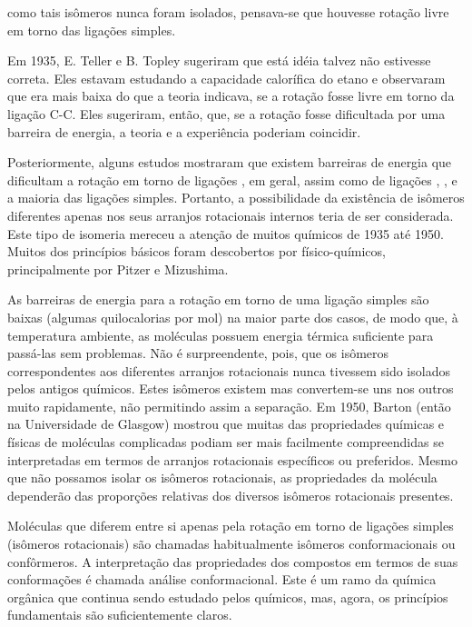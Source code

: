 \noindent como tais isômeros nunca foram isolados, pensava-se que houvesse rotação livre em torno das ligações simples. 

Em 1935, E. Teller e B. Topley sugeriram que está idéia talvez não estivesse correta. Eles estavam estudando a capacidade calorífica do etano e observaram que era mais baixa do que a teoria indicava, se a rotação fosse livre em torno da ligação C-C. Eles sugeriram, então, que, se a rotação fosse dificultada por uma barreira de energia, a teoria e a experiência poderiam coincidir.

Posteriormente, alguns estudos mostraram que existem barreiras de energia que dificultam a rotação em torno de ligações , em geral, assim como de ligações , , e a maioria das ligações simples. Portanto, a possibilidade da existência de isômeros diferentes apenas nos seus arranjos rotacionais internos teria de ser considerada. Este tipo de isomeria mereceu a atenção de muitos químicos de 1935 até 1950. Muitos dos princípios básicos foram descobertos por físico-químicos, principalmente por Pitzer e Mizushima. 

As barreiras de energia para a rotação em torno de uma ligação simples são baixas (algumas quilocalorias por mol) na maior parte dos casos, de modo que, à temperatura ambiente, as moléculas possuem energia térmica suficiente para passá-las sem problemas. Não é surpreendente, pois, que os isômeros correspondentes aos diferentes arranjos rotacionais nunca tivessem sido isolados pelos antigos químicos. Estes isômeros existem mas convertem-se uns nos outros muito rapidamente, não permitindo assim a separação. Em 1950, Barton (então na Universidade de Glasgow) mostrou que muitas das propriedades químicas e físicas de moléculas complicadas podiam ser mais facilmente compreendidas se interpretadas em termos de arranjos rotacionais específicos ou preferidos. Mesmo que não possamos isolar os isômeros rotacionais, as propriedades da molécula dependerão das proporções relativas dos diversos isômeros rotacionais presentes. 

Moléculas que diferem entre si apenas pela rotação em torno de ligações simples (isômeros rotacionais) são chamadas habitualmente isômeros conformacionais ou confôrmeros. A interpretação das propriedades dos compostos em termos de suas conformações é chamada análise conformacional. Este é um ramo da química orgânica que continua sendo estudado pelos químicos, mas, agora, os princípios fundamentais são suficientemente claros.

